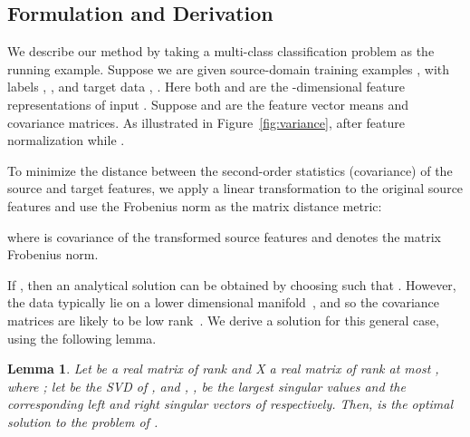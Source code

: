 \documentclass[letterpaper]{article}
\newtheorem{lemma}{Lemma}
\begin{document}
\subsection{Formulation and Derivation}
We describe our method by taking a multi-class classification problem as the running example. Suppose we are given source-domain training examples ,  with labels , , and target data , . Here both  and  are the -dimensional feature representations  of input . Suppose  and  are the feature vector means and covariance matrices. As illustrated in Figure~\ref{fig:variance},  after feature normalization while .

To minimize the distance between the second-order statistics (covariance) of the source and target features, we apply a linear transformation  to the original source features and use the Frobenius norm as the matrix distance metric:
      
where  is covariance of the transformed source features  and  denotes the matrix Frobenius norm. 

If , then an analytical solution can be obtained by choosing  such that .
However, the data typically lie on a lower dimensional manifold~\cite{outlooks,gfk,sasb}, and so the covariance matrices are likely to be low rank~\cite{who}. We derive a solution for this general case, using the following lemma.
\begin{lemma}\cite{SVT} 
\label{lemma:svt}
Let  be a real matrix of rank  and X a real matrix of rank at most , where ; let  be the SVD of , and , ,  be the largest  singular values and the corresponding left and right singular vectors of  respectively. Then,  is the optimal solution to the problem of .
\end{lemma}
\end{document}

